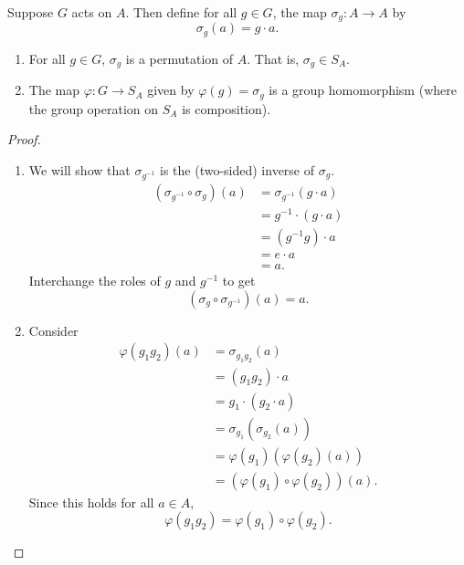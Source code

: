 Suppose $G$ acts on $A$.
Then define for all $g \in G$, the map $\sigma_g\colon A \to A$ by \[
    \sigma_g(a) = g \cdot a.
\]
\begin{proposition}
    \begin{enumerate}
        \item For all $g \in G$, $\sigma_g$ is a permutation of $A$.
        That is, $\sigma_g \in S_A$.
        \item The map $\varphi\colon G \to S_A$ given by
        $\varphi(g) = \sigma_g$ is a group homomorphism
        (where the group operation on $S_A$ is composition).
    \end{enumerate}
\end{proposition}
\begin{proof} \leavevmode
    \begin{enumerate}
        \item We will show that $\sigma_{g^{-1}}$ is the (two-sided)
        inverse of $\sigma_g$.
        \begin{align*}
            (\sigma_{g^{-1}} \circ \sigma_g)(a)
                &= \sigma_{g^{-1}}(g \cdot a) \\
                &= g^{-1} \cdot (g \cdot a) \\
                &= (g^{-1} g) \cdot a \\
                &= e \cdot a \\
                &= a.
        \end{align*}
        Interchange the roles of $g$ and $g^{-1}$ to get \[
            (\sigma_g \circ \sigma_{g^{-1}})(a) = a.
        \]
        \item Consider \begin{align*}
            \varphi(g_1 g_2)(a)
                &= \sigma_{g_1 g_2}(a) \\
                &= (g_1 g_2) \cdot a \\
                &= g_1 \cdot (g_2 \cdot a) \\
                &= \sigma_{g_1}(\sigma_{g_2}(a)) \\
                &= \varphi(g_1)(\varphi(g_2)(a)) \\
                &= (\varphi(g_1) \circ \varphi(g_2))(a).
        \end{align*}
        Since this holds for all $a \in A$, \[
            \varphi(g_1 g_2) = \varphi(g_1) \circ \varphi(g_2).
        \]
    \end{enumerate}
\end{proof}


